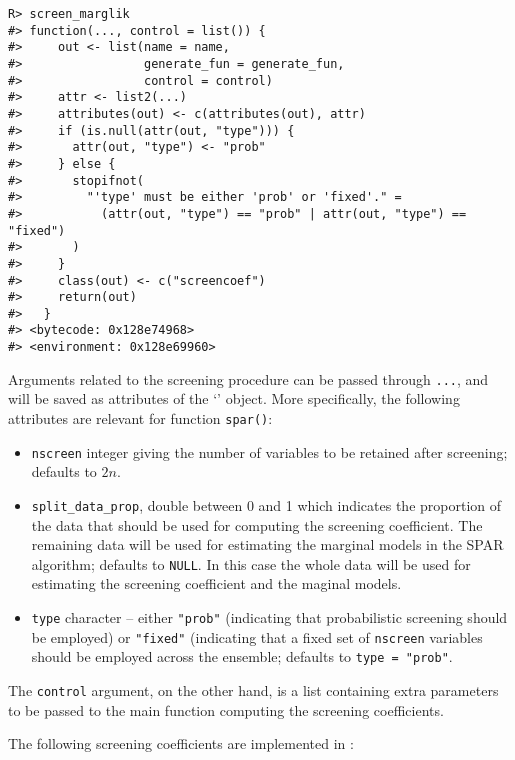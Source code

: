 \documentclass[
  article]{jss}
\newcommand{\class}[1]{`\code{#1}'}
\begin{document}
\begin{verbatim}
R> screen_marglik
#> function(..., control = list()) {
#>     out <- list(name = name,
#>                 generate_fun = generate_fun,
#>                 control = control)
#>     attr <- list2(...)
#>     attributes(out) <- c(attributes(out), attr)
#>     if (is.null(attr(out, "type"))) {
#>       attr(out, "type") <- "prob"
#>     } else {
#>       stopifnot(
#>         "'type' must be either 'prob' or 'fixed'." =
#>           (attr(out, "type") == "prob" | attr(out, "type") == "fixed")
#>       )
#>     }
#>     class(out) <- c("screencoef")
#>     return(out)
#>   }
#> <bytecode: 0x128e74968>
#> <environment: 0x128e69960>
\end{verbatim}

Arguments related to the screening procedure can be passed through
\texttt{...}, and will be saved as attributes of the \class{screencoef}
object. More specifically, the following attributes are relevant for
function \texttt{spar()}:

\begin{itemize}
\item
  \texttt{nscreen} integer giving the number of variables to be retained
  after screening; defaults to \(2n\).
\item
  \texttt{split\_data\_prop}, double between 0 and 1 which indicates the
  proportion of the data that should be used for computing the screening
  coefficient. The remaining data will be used for estimating the
  marginal models in the SPAR algorithm; defaults to \texttt{NULL}. In
  this case the whole data will be used for estimating the screening
  coefficient and the maginal models.
\item
  \texttt{type} character -- either \texttt{"prob"} (indicating that
  probabilistic screening should be employed) or \texttt{"fixed"}
  (indicating that a fixed set of \texttt{nscreen} variables should be
  employed across the ensemble; defaults to \texttt{type\ =\ "prob"}.
\end{itemize}

The \texttt{control} argument, on the other hand, is a list containing
extra parameters to be passed to the main function computing the
screening coefficients.

The following screening coefficients are implemented in :
\end{document}
